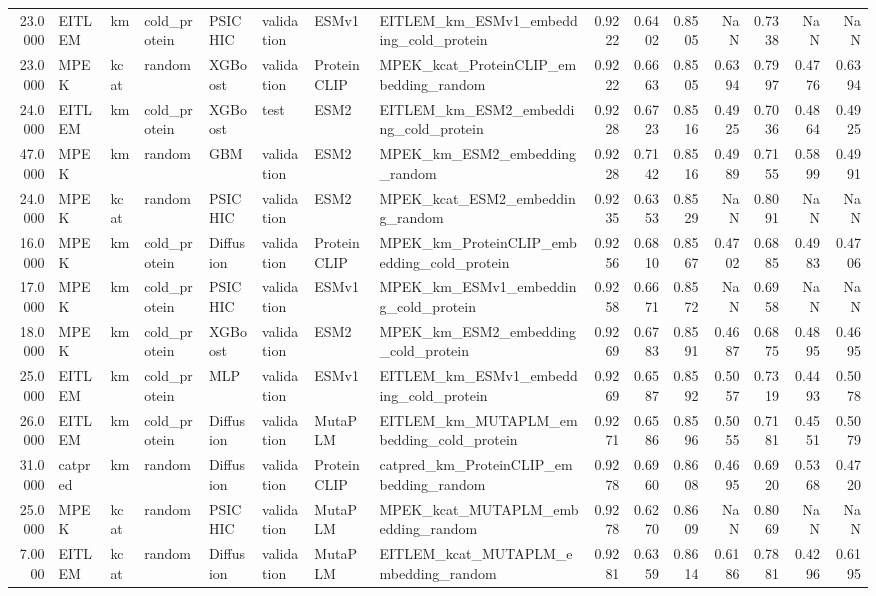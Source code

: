\begin{tabular}{rlllllllrrrrrrr}
23.0000 & EITLEM & km & cold_protein & PSICHIC & validation & ESMv1 & EITLEM_km_ESMv1_embedding_cold_protein & 0.9222 & 0.6402 & 0.8505 & NaN & 0.7338 & NaN & NaN \\
23.0000 & MPEK & kcat & random & XGBoost & validation & ProteinCLIP & MPEK_kcat_ProteinCLIP_embedding_random & 0.9222 & 0.6663 & 0.8505 & 0.6394 & 0.7997 & 0.4776 & 0.6394 \\
24.0000 & EITLEM & km & cold_protein & XGBoost & test & ESM2 & EITLEM_km_ESM2_embedding_cold_protein & 0.9228 & 0.6723 & 0.8516 & 0.4925 & 0.7036 & 0.4864 & 0.4925 \\
47.0000 & MPEK & km & random & GBM & validation & ESM2 & MPEK_km_ESM2_embedding_random & 0.9228 & 0.7142 & 0.8516 & 0.4989 & 0.7155 & 0.5899 & 0.4991 \\
24.0000 & MPEK & kcat & random & PSICHIC & validation & ESM2 & MPEK_kcat_ESM2_embedding_random & 0.9235 & 0.6353 & 0.8529 & NaN & 0.8091 & NaN & NaN \\
16.0000 & MPEK & km & cold_protein & Diffusion & validation & ProteinCLIP & MPEK_km_ProteinCLIP_embedding_cold_protein & 0.9256 & 0.6810 & 0.8567 & 0.4702 & 0.6885 & 0.4983 & 0.4706 \\
17.0000 & MPEK & km & cold_protein & PSICHIC & validation & ESMv1 & MPEK_km_ESMv1_embedding_cold_protein & 0.9258 & 0.6671 & 0.8572 & NaN & 0.6958 & NaN & NaN \\
18.0000 & MPEK & km & cold_protein & XGBoost & validation & ESM2 & MPEK_km_ESM2_embedding_cold_protein & 0.9269 & 0.6783 & 0.8591 & 0.4687 & 0.6875 & 0.4895 & 0.4695 \\
25.0000 & EITLEM & km & cold_protein & MLP & validation & ESMv1 & EITLEM_km_ESMv1_embedding_cold_protein & 0.9269 & 0.6587 & 0.8592 & 0.5057 & 0.7319 & 0.4493 & 0.5078 \\
26.0000 & EITLEM & km & cold_protein & Diffusion & validation & MutaPLM & EITLEM_km_MUTAPLM_embedding_cold_protein & 0.9271 & 0.6586 & 0.8596 & 0.5055 & 0.7181 & 0.4551 & 0.5079 \\
31.0000 & catpred & km & random & Diffusion & validation & ProteinCLIP & catpred_km_ProteinCLIP_embedding_random & 0.9278 & 0.6960 & 0.8608 & 0.4695 & 0.6920 & 0.5368 & 0.4720 \\
25.0000 & MPEK & kcat & random & PSICHIC & validation & MutaPLM & MPEK_kcat_MUTAPLM_embedding_random & 0.9278 & 0.6270 & 0.8609 & NaN & 0.8069 & NaN & NaN \\
7.0000 & EITLEM & kcat & random & Diffusion & validation & MutaPLM & EITLEM_kcat_MUTAPLM_embedding_random & 0.9281 & 0.6359 & 0.8614 & 0.6186 & 0.7881 & 0.4296 & 0.6195 \\

\end{tabular}

